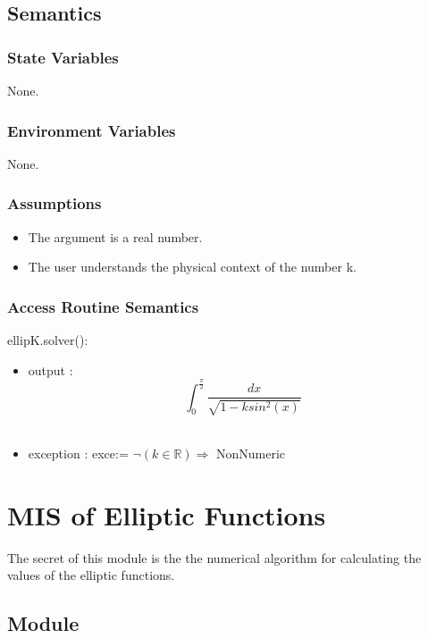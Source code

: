 \documentclass[12pt, titlepage]{article}
\begin{document}
\subsection{Semantics}

\subsubsection{State Variables}

None.

\subsubsection{Environment Variables}

None.

\subsubsection{Assumptions}

\begin{itemize}
	\item The argument is a real number. 
	\item The user understands the physical context of the number k.  
\end{itemize}

\subsubsection{Access Routine Semantics}

\noindent ellipK.solver():
\begin{itemize}
	\item output : \\
	$$ 
	\int_{0}^{\frac{\pi}{2}} \frac{dx}{\sqrt{1-ksin^{2}(x)}}$$ \\
	\item exception : exce:= $\neg(k\in \mathbb{R}) \Rightarrow$ 
	NonNumeric
\end{itemize}

\newpage

\section{MIS of Elliptic Functions} 

The secret of this module is the the numerical algorithm for calculating the 
values of the elliptic functions.

\subsection{Module}
\end{document}
